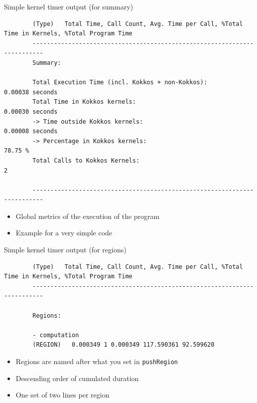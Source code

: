 \documentclass[
    aspectratio=169,
]{beamer}
\begin{document}
\begin{frame}[fragile]{Simple kernel timer output (for summary)}
    \begin{verbatim}
        (Type)   Total Time, Call Count, Avg. Time per Call, %Total Time in Kernels, %Total Program Time
        -------------------------------------------------------------------------
        Summary:

        Total Execution Time (incl. Kokkos + non-Kokkos):                   0.00038 seconds
        Total Time in Kokkos kernels:                                       0.00030 seconds
        -> Time outside Kokkos kernels:                                  0.00008 seconds
        -> Percentage in Kokkos kernels:                                   78.75 %
        Total Calls to Kokkos Kernels:                                            2

        -------------------------------------------------------------------------
    \end{verbatim}
    \begin{itemize}
        \item Global metrics of the execution of the program
        \item Example for a very simple code
    \end{itemize}
\end{frame}

\begin{frame}[fragile]{Simple kernel timer output (for regions)}
    \begin{verbatim}
        (Type)   Total Time, Call Count, Avg. Time per Call, %Total Time in Kernels, %Total Program Time
        -------------------------------------------------------------------------

        Regions:

        - computation
        (REGION)   0.000349 1 0.000349 117.590361 92.599620
    \end{verbatim}

    \begin{itemize}
        \item Regions are named after what you set in \texttt{pushRegion}
        \item Descending order of cumulated duration
        \item One set of two lines per region
    \end{itemize}
\end{frame}
\end{document}
